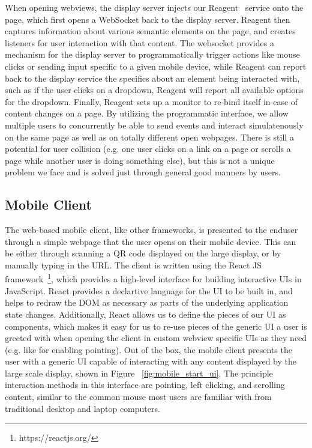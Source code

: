 When opening webviews, the display server injects our
Reagent~\cite{peveler_reagent:_2019} service onto the page, which
first opens a WebSocket back to the display server. Reagent then
captures information about various semantic elements on the page,
and creates listeners for user interaction with that content. The
websocket provides a mechanism for the display server to
programmatically trigger actions like mouse clicks or sending
input specific to a given mobile device, while Reagent can report
back to the display service the specifics about an element being
interacted with, such as if the user clicks on a dropdown, Reagent
will report all available options for the dropdown. Finally,
Reagent sets up a monitor to re-bind itself in-case of content
changes on a page. By utilizing the programmatic interface,
we allow multiple users to concurrently be able to send events
and interact simulatenously on the same page as well as
on totally different open webpages. There is still a potential
for user collision (e.g. one user clicks on a link on a page or
scrolls a page while another user is doing something else), but this
is not a unique problem we face and is solved just through general
good manners by users.

\subsection{Mobile Client}

The web-based mobile client, like other frameworks, is presented to the enduser through a simple webpage that the user opens on their
mobile device. This
can be either through scanning a QR code displayed on the large
display, or by manually typing in the URL. The client is
written using the React JS
framework~\footnote{https://reactjs.org/}, which provides a
high-level interface for building interactive UIs in JavaScript.
React provides a declartive language for the UI to be built in,
and helps to redraw the DOM as necessary as parts of the underlying
application state changes. Additionally, React allows us to define
the pieces of our UI as components, which makes it easy for us to
re-use pieces of the generic UI a user is greeted with when opening
the client in custom webview specific UIs as they need (e.g. like
for enabling pointing).
Out of the box, the mobile client presents the user with a generic
UI capable of interacting with any content displayed by the
large scale display, shown in Figure ~\ref{fig:mobile_start_ui}. The principle interaction methods in this
interface are pointing, left clicking, and scrolling content, similar
to the common mouse most users are familiar with from traditional
desktop and laptop computers.

